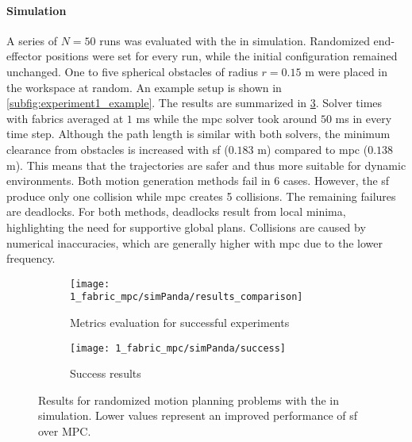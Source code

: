 \paragraph{Simulation}
A series of $N=50$ runs was evaluated with the \panda{} in simulation. Randomized
end-effector positions were set for every run, while the initial configuration
remained unchanged. One to five spherical obstacles of
radius $r=0.15$ m were
placed in the workspace at random. An example setup is shown in
\cref{subfig:experiment1_example}. The results are summarized in 
\cref{fig:experiment1_simPanda}. Solver times with fabrics averaged at $1$ ms while the
\ac{mpc} solver took around $50$ ms in every time step. Although the path length is similar
with both solvers, the minimum clearance from obstacles is increased with \ac{sf}
($0.183$ m) compared to \ac{mpc} ($0.138$ m). This means that the trajectories are
safer and thus more suitable for dynamic environments.
Both motion generation methods fail in 6 cases. However, the \ac{sf} produce only
one collision while \ac{mpc} creates 5 collisions. The remaining failures are deadlocks.
For both methods, deadlocks result from local minima, highlighting the 
need for supportive global plans. Collisions are caused
by numerical inaccuracies, which are generally higher with \ac{mpc} due
to the lower frequency.

\begin{figure}[h]
  \centering
  \begin{subfigure}{1.0\linewidth}
    \centering
    \texttt{[image: 1\_fabric\_mpc/simPanda/results\_comparison]}
    \caption{Metrics evaluation for successful experiments}%
    \label{subfig:experiment1_simPanda_res}
  \end{subfigure}
  \begin{subfigure}{1.0\linewidth}
    \centering
    \texttt{[image: 1\_fabric\_mpc/simPanda/success]}
    \caption{Success results}%
    \label{subfig:experiment1_simPanda_success}
  \end{subfigure}
  \caption{Results for randomized motion planning problems with the \panda{} in simulation.
    Lower values represent an improved performance of \ac{sf} over MPC.
  }%
  \label{fig:experiment1_simPanda}
\end{figure}

